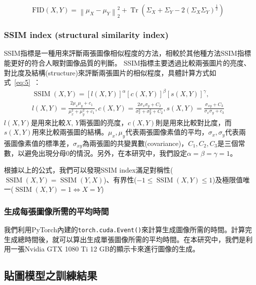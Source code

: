\documentclass[a4paper, 12pt]{article}
\begin{document}
\begin{equation}
    \mathrm{FID}(X, Y)=\left\|\mu_{X}-\mu_{Y}\right\|_{2}^{2}+\operatorname{Tr}\left(\Sigma_{X}+\Sigma_{Y}-2\left(\Sigma_{X} \Sigma_{Y}\right)^{\frac{1}{2}}\right)
    \label{eq:4}
\end{equation}

\subsubsection{SSIM index (structural similarity index)}
SSIM指標\cite{wang2004image}是一種用來評斷兩張圖像相似程度的方法，相較於其他種方法SSIM指標能更好的符合人眼對圖像品質的判斷。
SSIM指標主要透過比較兩張圖片的亮度、對比度及結構(structure)來評斷兩張圖片的相似程度，具體計算方式如式~\ref{eq:5}~：
\begin{equation}
    \begin{array}{l}
        \operatorname{SSIM}(X, Y)=[l(X, Y)]^{\alpha}[c(X, Y)]^{\beta}[s(X, Y)]^{\gamma}, \\
        l(X, Y)=\frac{2 \mu_{x} \mu_{y}+c_{1}}{\mu_{x}^{2}+\mu_{y}^{2}+c_{1}}, c(X, Y)=\frac{2 \sigma_{x} \sigma_{y}+C_{2}}{\sigma_{x}^{2}+\sigma_{y}^{2}+C_{2}}, s(X, Y)=\frac{\sigma_{x y}+C_{3}}{\sigma_{x} \sigma_{y}+c_{3}}
    \end{array}
    \label{eq:5}
\end{equation}
$l(X,Y)$是用來比較$X$, $Y$兩張圖的亮度，$c(X,Y)$則是用來比較對比度，而$s(X,Y)$用來比較兩張圖的結構。$\mu_x,\mu_y$代表兩張圖像素值的平均，$\sigma_x,\sigma_y$代表兩張圖像素值的標準差，$\sigma_{xy}$為兩張圖的共變異數(covariance)，$C_1,C_2,C_3$是三個常數，以避免出現分母0的情況。另外，在本研究中，我們設定$\alpha=\beta=\gamma=1$。

根據以上的公式，我們可以發現SSIM index滿足對稱性($\operatorname{SSIM}(X,Y)=\operatorname{SSIM}(Y,X)$)、有界性($-1\leq \operatorname{SSIM}(X,Y)\leq 1$)及極限值唯一($\operatorname{SSIM}(X,Y)=1 \Longleftrightarrow X=Y$)

\subsubsection{生成每張圖像所需的平均時間}

我們利用PyTorch內建的\texttt{torch.cuda.Event()}來計算生成圖像所需的時間。計算完生成總時間後，就可以算出生成單張圖像所需的平均時間。在本研究中，我們是利用一張Nvidia GTX 1080 Ti 12 GB的顯示卡來進行圖像的生成。

\subsection{貼圖模型之訓練結果}
\end{document}
